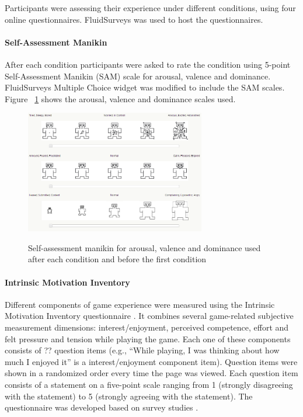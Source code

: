 \documentclass{uofsthesis-cs}
\begin{document}
Participants were assessing their experience under different conditions, using four online questionnaires. FluidSurveys was used to host the questionnaires.

\paragraph{Self-Assessment Manikin}

After each condition participants were asked to rate the condition using 5-point Self-Assessment Manikin (SAM) \cite{bradley1994measuring} scale for arousal, valence and dominance. \textregistered FluidSurveys Multiple Choice widget was modified to include the SAM scales. Figure ~\ref{fig:sam} shows the arousal, valence and dominance scales used.

\begin{figure}[h!]
  \caption[Self-assessment manikin]
  {Self-assessment manikin for arousal, valence and dominance used after each condition and before the first condition}
  \centering
  \includegraphics[width=0.7\textwidth]{images/sam.png}
  \label{fig:sam}
\end{figure}

\paragraph{Intrinsic Motivation Inventory}

Different components of game experience were measured using the Intrinsic Motivation Inventory questionnaire \cite{?}. It combines several game-related subjective measurement dimensions: interest/enjoyment, perceived competence, effort and felt pressure and tension while playing the game. Each one of these components consists of ?? question items (e.g., ``While playing, I was thinking about how much I enjoyed it'' is a interest/enjoyment component item). Question items were shown in a randomized order every time the page was viewed. Each question item consists of a statement on a five-point scale ranging from 1 (strongly disagreeing with the statement) to 5 (strongly agreeing with the statement). The questionnaire was developed based on survey studies \cite{?}.
\end{document}
